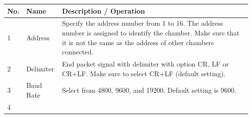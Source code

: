 \begin{longtable}[]{@{}lll@{}}
\toprule
\begin{minipage}[b]{0.14\columnwidth}\raggedright
No.\strut
\end{minipage} & \begin{minipage}[b]{0.19\columnwidth}\raggedright
Name\strut
\end{minipage} & \begin{minipage}[b]{0.59\columnwidth}\raggedright
Description / Operation\strut
\end{minipage}\tabularnewline
\midrule
\endhead
\begin{minipage}[t]{0.14\columnwidth}\raggedright
1\strut
\end{minipage} & \begin{minipage}[t]{0.19\columnwidth}\raggedright
Address\strut
\end{minipage} & \begin{minipage}[t]{0.59\columnwidth}\raggedright
Specify the address number from 1 to 16. The address number is assigned
to identify the chamber. Make sure that it is not the same as the
address of other chambers connected.\strut
\end{minipage}\tabularnewline
\begin{minipage}[t]{0.14\columnwidth}\raggedright
2\strut
\end{minipage} & \begin{minipage}[t]{0.19\columnwidth}\raggedright
Delimiter\strut
\end{minipage} & \begin{minipage}[t]{0.59\columnwidth}\raggedright
End packet signal with delimiter with option CR, LF or CR+LF. Make sure
to select CR+LF (default setting).\strut
\end{minipage}\tabularnewline
\begin{minipage}[t]{0.14\columnwidth}\raggedright
3\strut
\end{minipage} & \begin{minipage}[t]{0.19\columnwidth}\raggedright
Baud Rate\strut
\end{minipage} & \begin{minipage}[t]{0.59\columnwidth}\raggedright
Select from 4800, 9600, and 19200. Default setting is 9600.\strut
\end{minipage}\tabularnewline
\begin{minipage}[t]{0.14\columnwidth}\raggedright
4\strut
\end{minipage} & \begin{minipage}[t]{0.19\columnwidth}\raggedright

\end{minipage}
\end{longtable}
